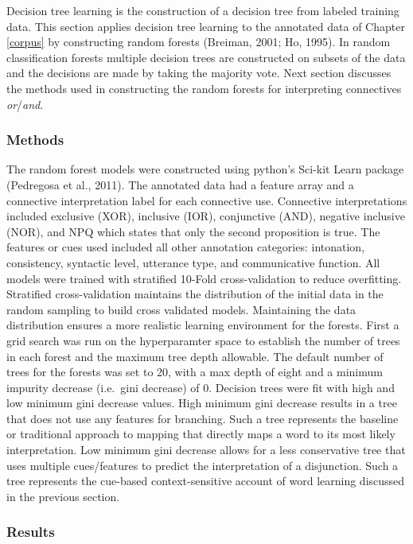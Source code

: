 \documentclass[floatsintext,man]{apa6}
\theoremstyle{definition}
\theoremstyle{definition}
\theoremstyle{definition}
\theoremstyle{remark}
\begin{document}
Decision tree learning is the construction of a decision tree from
labeled training data. This section applies decision tree learning to
the annotated data of Chapter \ref{corpus} by constructing random
forests (Breiman, 2001; Ho, 1995). In random classification forests
multiple decision trees are constructed on subsets of the data and the
decisions are made by taking the majority vote. Next section discusses
the methods used in constructing the random forests for interpreting
connectives \emph{or}/\emph{and}.

\subsubsection{Methods}\label{methods-1}

The random forest models were constructed using python's Sci-kit Learn
package (Pedregosa et al., 2011). The annotated data had a feature array
and a connective interpretation label for each connective use.
Connective interpretations included exclusive (XOR), inclusive (IOR),
conjunctive (AND), negative inclusive (NOR), and NPQ which states that
only the second proposition is true. The features or cues used included
all other annotation categories: intonation, consistency, syntactic
level, utterance type, and communicative function. All models were
trained with stratified 10-Fold cross-validation to reduce overfitting.
Stratified cross-validation maintains the distribution of the initial
data in the random sampling to build cross validated models. Maintaining
the data distribution ensures a more realistic learning environment for
the forests. First a grid search was run on the hyperparamter space to
establish the number of trees in each forest and the maximum tree depth
allowable. The default number of trees for the forests was set to 20,
with a max depth of eight and a minimum impurity decrease (i.e.~gini
decrease) of 0. Decision trees were fit with high and low minimum gini
decrease values. High minimum gini decrease results in a tree that does
not use any features for branching. Such a tree represents the baseline
or traditional approach to mapping that directly maps a word to its most
likely interpretation. Low minimum gini decrease allows for a less
conservative tree that uses multiple cues/features to predict the
interpretation of a disjunction. Such a tree represents the cue-based
context-sensitive account of word learning discussed in the previous
section.

\subsubsection{Results}\label{results}
\end{document}
